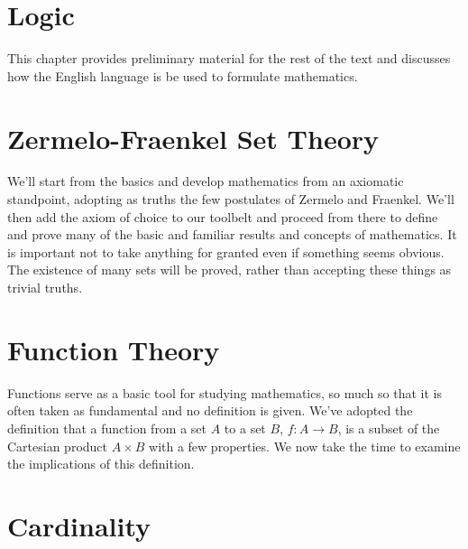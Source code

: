 \begingroup
    \ifcsname\PATH\endcsname
        \newcommand{\PATH}{books/Foundations/ZFC}
        \newcommand{\OLDPATH}{\PATH}
    \else
        \newcommand{\OLDPATH}{\PATH}
        \renewcommand{\PATH}{books/Foundations/ZFC}
    \fi
    \chapter{Logic}
        \label{chapt:Logic}%
        This chapter provides preliminary material for the rest of the text and
        discusses how the English language is be used to formulate mathematics.
        
        
    \chapter{Zermelo-Fraenkel Set Theory}
        \label{chapt:Zermelo_Fraenkel_Set_Theory}%
        We'll start from the basics and develop mathematics from an axiomatic
        standpoint, adopting as truths the few postulates of Zermelo and
        Fraenkel. We'll then add the axiom of choice to our toolbelt and
        proceed from there to define and prove many of the basic and familiar
        results and concepts of mathematics. It is important not to take
        anything for granted even if something seems obvious. The existence of
        many sets will be proved, rather than accepting these things as trivial
        truths.
        
        
        
    \chapter{Function Theory}
        \label{chapt:Function_Theory}%
        Functions serve as a basic tool for studying mathematics, so much so
        that it is often taken as fundamental and no definition is given. We've
        adopted the definition that a function from a set $A$ to
        a set $B$, $f:A\rightarrow{B}$, is a subset of the Cartesian product
        $A\times{B}$ with a few properties. We now take the time to examine the
        implications of this definition.
        
        
        
        
    \chapter{Cardinality}
        
    \renewcommand{\PATH}{\OLDPATH}
\endgroup